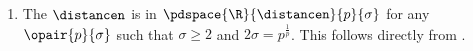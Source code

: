\begin{example}
\begin{enumerate}
  \item The  $\distancen$ is  in
        $\pdspace{\R}{\distancen}{p}{\sigma}$
        for any $\opair{p}{\sigma}$ such that $\sigma\ge2$ and $2\sigma=p^\frac{1}{p}$.
        This follows directly from .
\end{enumerate}
\end{example}





